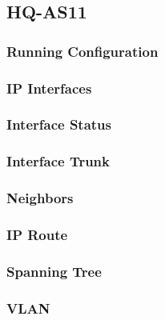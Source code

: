 \subsection{HQ-AS11}
\subsubsection{Running Configuration}


\subsubsection{IP Interfaces}


\subsubsection{Interface Status}


\subsubsection{Interface Trunk}


\subsubsection{Neighbors}


\subsubsection{IP Route}


\subsubsection{Spanning Tree}


\subsubsection{VLAN}





